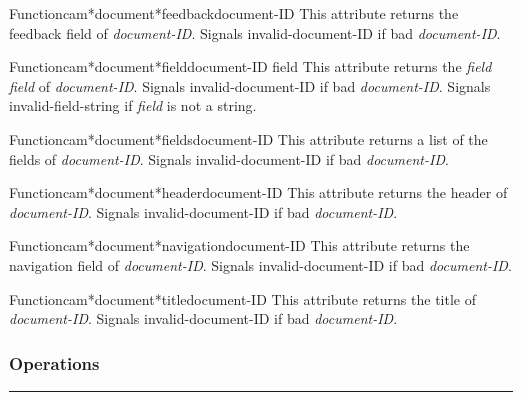 \begin{functiondoc}{Function}{cam*document*feedback}{document-ID}
This attribute returns the feedback field of {\em document-ID}.
Signals invalid-document-ID if bad {\em document-ID}.
\end{functiondoc}

\begin{functiondoc}{Function}{cam*document*field}{document-ID field}
This attribute returns the {\em field} {\em field} of {\em document-ID}.
Signals invalid-document-ID if bad {\em document-ID}.
Signals invalid-field-string if {\em field} is not a string.
\end{functiondoc}

\begin{functiondoc}{Function}{cam*document*fields}{document-ID}
This attribute returns a list of the fields of {\em document-ID}.
Signals invalid-document-ID if bad {\em document-ID}.
\end{functiondoc}

\begin{functiondoc}{Function}{cam*document*header}{document-ID}
This attribute returns the header of {\em document-ID}.
Signals invalid-document-ID if bad {\em document-ID}.
\end{functiondoc}

\begin{functiondoc}{Function}{cam*document*navigation}{document-ID}
This attribute returns the navigation field of {\em document-ID}.
Signals invalid-document-ID if bad {\em document-ID}.
\end{functiondoc}

\begin{functiondoc}{Function}{cam*document*title}{document-ID}
This attribute returns the title of {\em document-ID}.
Signals invalid-document-ID if bad {\em document-ID}.
\end{functiondoc}


\subsubsection*{Operations}
\par\vspace*{0.00in}\par\hrule\par\medskip\par


